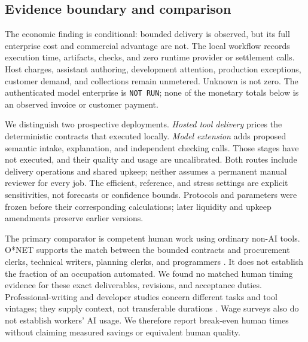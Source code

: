 \subsection{Evidence boundary and comparison}

The economic finding is conditional: bounded delivery is observed, but its full
enterprise cost and commercial advantage are not. The local workflow records
execution time, artifacts, checks, and zero runtime provider or settlement calls.
Host charges, assistant authoring, development attention, production exceptions,
customer demand, and collections remain unmetered. Unknown is not zero. The
authenticated model enterprise is \texttt{NOT RUN}; none of the monetary totals
below is an observed invoice or customer payment.

We distinguish two prospective deployments. \emph{Hosted tool delivery} prices
the deterministic contracts that executed locally. \emph{Model extension} adds
proposed semantic intake, explanation, and independent checking calls. Those
stages have not executed, and their quality and usage are uncalibrated. Both
routes include delivery operations and shared upkeep; neither assumes a permanent
manual reviewer for every job. The efficient, reference, and stress settings are
explicit sensitivities, not forecasts or confidence bounds. Protocols and
parameters were frozen before their corresponding calculations; later liquidity
and upkeep amendments preserve earlier versions.

The primary comparator is competent human work using ordinary non-AI tools.
O*NET supports the match between the bounded contracts and procurement clerks,
technical writers, planning clerks, and programmers
\cite{onetprocurement,onetwriters,onetplanning,onetprogrammers}. It does not
establish the fraction of an occupation automated. We found no matched human
timing evidence for these exact deliverables, revisions, and acceptance duties.
Professional-writing and developer studies concern different tasks and tool
vintages; they supply context, not transferable durations
\cite{noyzhang2023,becker2025,metrupdate2026}. Wage surveys also do not establish
workers' AI usage. We therefore report break-even human times without claiming
measured savings or equivalent human quality.

